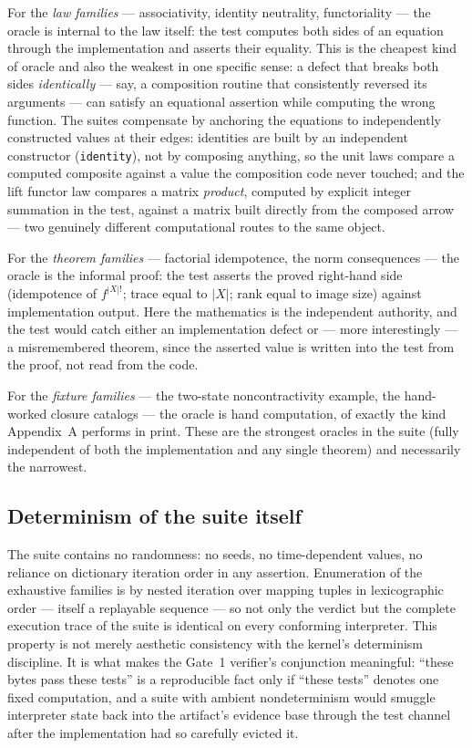For the \emph{law families} --- associativity, identity neutrality,
functoriality --- the oracle is internal to the law itself: the test
computes both sides of an equation through the implementation and asserts
their equality. This is the cheapest kind of oracle and also the weakest
in one specific sense: a defect that breaks both sides \emph{identically}
--- say, a composition routine that consistently reversed its arguments
--- can satisfy an equational assertion while computing the wrong
function. The suites compensate by anchoring the equations to
independently constructed values at their edges: identities are built by
an independent constructor (\texttt{identity}), not by composing anything,
so the unit laws compare a computed composite against a value the
composition code never touched; and the lift functor law compares a
matrix \emph{product}, computed by explicit integer summation in the test,
against a matrix built directly from the composed arrow --- two
genuinely different computational routes to the same object.

For the \emph{theorem families} --- factorial idempotence, the norm
consequences --- the oracle is the informal proof: the test asserts the
proved right-hand side (idempotence of $f^{|X|!}$; trace equal to $|X|$;
rank equal to image size) against implementation output. Here the
mathematics is the independent authority, and the test would catch either
an implementation defect or --- more interestingly --- a misremembered
theorem, since the asserted value is written into the test from the
proof, not read from the code.

For the \emph{fixture families} --- the two-state noncontractivity
example, the hand-worked closure catalogs --- the oracle is hand
computation, of exactly the kind Appendix~A performs in print. These are
the strongest oracles in the suite (fully independent of both the
implementation and any single theorem) and necessarily the narrowest.

\subsection{Determinism of the suite itself}

The suite contains no randomness: no seeds, no time-dependent values, no
reliance on dictionary iteration order in any assertion. Enumeration of
the exhaustive families is by nested iteration over mapping tuples in
lexicographic order --- itself a replayable sequence --- so not only the
verdict but the complete execution trace of the suite is identical on
every conforming interpreter. This property is not merely aesthetic
consistency with the kernel's determinism discipline. It is what makes
the Gate~1 verifier's conjunction meaningful: ``these bytes pass these
tests'' is a reproducible fact only if ``these tests'' denotes one fixed
computation, and a suite with ambient nondeterminism would smuggle
interpreter state back into the artifact's evidence base through the
test channel after the implementation had so carefully evicted it.

